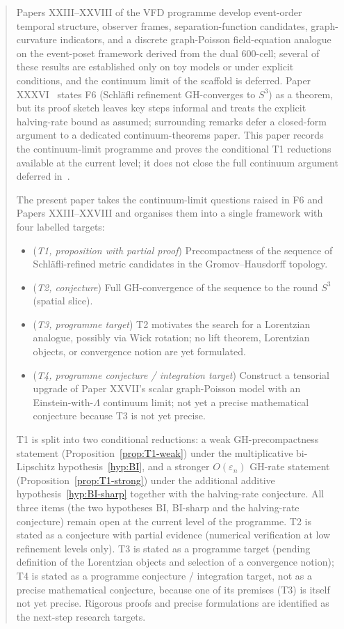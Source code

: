 \documentclass[12pt]{article}
\theoremstyle{definition}
\theoremstyle{remark}
\begin{document}
\begin{abstract}
Papers XXIII--XXVIII of the VFD programme develop event-order temporal structure, observer frames, separation-function candidates, graph-curvature indicators, and a discrete graph-Poisson field-equation analogue on the event-poset framework derived from the dual 600-cell; several of these results are established only on toy models or under explicit conditions, and the continuum limit of the scaffold is deferred. Paper XXXVI~\citep{SmartXXXVI} states F6 (Schl\"afli refinement GH-converges to $S^3$) as a theorem, but its proof sketch leaves key steps informal and treats the explicit halving-rate bound as assumed; surrounding remarks defer a closed-form argument to a dedicated continuum-theorems paper. This paper records the continuum-limit programme and proves the conditional T1 reductions available at the current level; it does not close the full continuum argument deferred in~\citep{SmartXXXVI}.

The present paper takes the continuum-limit questions raised in F6 and Papers XXIII--XXVIII and organises them into a single framework with four labelled targets:
\begin{itemize}
\item (\emph{T1, proposition with partial proof}) Precompactness of the sequence of Schl\"afli-refined metric candidates in the Gromov--Hausdorff topology.
\item (\emph{T2, conjecture}) Full GH-convergence of the sequence to the round $S^3$ (spatial slice).
\item (\emph{T3, programme target}) T2 motivates the search for a Lorentzian analogue, possibly via Wick rotation; no lift theorem, Lorentzian objects, or convergence notion are yet formulated.
\item (\emph{T4, programme conjecture / integration target}) Construct a tensorial upgrade of Paper XXVII's scalar graph-Poisson model with an Einstein-with-$\Lambda$ continuum limit; not yet a precise mathematical conjecture because T3 is not yet precise.
\end{itemize}
T1 is split into two conditional reductions: a weak GH-precompactness statement (Proposition~\ref{prop:T1-weak}) under the multiplicative bi-Lipschitz hypothesis~\ref{hyp:BI}, and a stronger $O(\varepsilon_n)$ GH-rate statement (Proposition~\ref{prop:T1-strong}) under the additional additive hypothesis~\ref{hyp:BI-sharp} together with the halving-rate conjecture. All three items (the two hypotheses BI, BI-sharp and the halving-rate conjecture) remain open at the current level of the programme. T2 is stated as a conjecture with partial evidence (numerical verification at low refinement levels only). T3 is stated as a programme target (pending definition of the Lorentzian objects and selection of a convergence notion); T4 is stated as a programme conjecture / integration target, not as a precise mathematical conjecture, because one of its premises (T3) is itself not yet precise. Rigorous proofs and precise formulations are identified as the next-step research targets.


\end{abstract}
\end{document}
